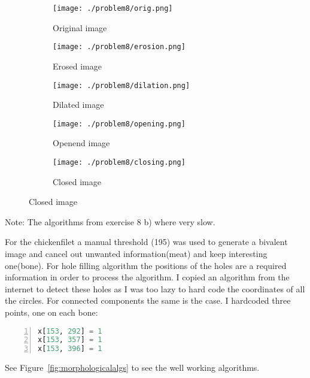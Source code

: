 \documentclass[a4paper]{scrartcl}
\begin{document}
\begin{figure}[H]
  \centering
  \caption{}
  \label{fig:erosiondelation}
  \begin{subfigure}[t]{0.4\textwidth}
    \texttt{[image: ./problem8/orig.png]}
    \caption{Original image}
  \end{subfigure}
  \begin{subfigure}[t]{0.4\textwidth}
    \texttt{[image: ./problem8/erosion.png]}
    \caption{Erosed image}
  \end{subfigure}
  \begin{subfigure}[t]{0.4\textwidth}
    \texttt{[image: ./problem8/dilation.png]}
    \caption{Dilated image}
  \end{subfigure}
  \begin{subfigure}[t]{0.4\textwidth}
    \texttt{[image: ./problem8/opening.png]}
    \caption{Openend image}
  \end{subfigure}
  \begin{subfigure}[t]{0.4\textwidth}
    \texttt{[image: ./problem8/closing.png]}
    \caption{Closed image}
  \end{subfigure}
\end{figure}

Note: The algorithms from exercise 8 b) where very slow.

For the chickenfilet a manual threshold (195) was used to generate a bivalent image and cancel out unwanted information(meat) and keep interesting one(bone). For hole filling algorithm the positions of the holes are a required information in order to process the algorithm. I copied an algorithm from the internet to detect these holes as I was too lazy to hard code the coordinates of all the circles.
For connected components the same is the case. I hardcoded three points, one on each bone:

\begin{lstlisting}[frame=single, backgroundcolor=\color{light-gray}, basicstyle=\footnotesize\ttfamily, language=Python, numbers=left, numberstyle=\tiny\color{black},caption= {A desciption of the listing}]
x[153, 292] = 1
x[153, 357] = 1
x[153, 396] = 1
\end{lstlisting}

See Figure~\ref{fig:morphologicalalgs} to see the well working algorithms.
\end{document}
